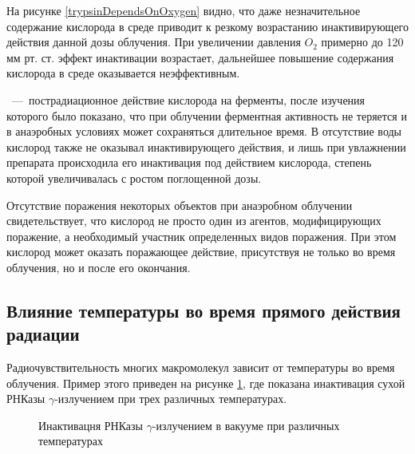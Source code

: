 \documentclass[a4paper, 14pt]{article}
\renewcommand{\emph}[1]{{\color{orange}{\textit{\textbf{#1}}}}}
\begin{document}
На рисунке \ref{trypsinDependsOnOxygen} видно, что даже незначительное содержание кислорода в среде приводит к резкому возрастанию инактивирующего действия данной дозы облучения. При увеличении давления $O_2$ примерно до 120 мм рт. ст. эффект инактивации возрастает, дальнейшее повышение содержания кислорода в среде оказывается неэффективным.

\emph{Кислородное последействие}~---~пострадиационное действие кислорода на
ферменты, после изучения которого было показано, что при облучении ферментная
активность не теряется и в анаэробных условиях может сохраняться длительное время.
В отсутствие воды кислород также не оказывал инактивирующего действия, и лишь при увлажнении препарата происходила его инактивация под действием кислорода,
степень которой увеличивалась с ростом поглощенной дозы.

Отсутствие поражения некоторых объектов при анаэробном облучении
свидетельствует, что кислород не просто один из агентов, модифицирующих
поражение, а необходимый участник определенных видов поражения. При этом
кислород может оказать поражающее действие, присутствуя не только во время
облучения, но и после его окончания.

\subsection{Влияние температуры во время прямого действия радиации}
Радиочувствительность многих макромолекул зависит от температуры во время облучения. Пример этого приведен на рисунке \ref{inactivationOfRNAWithVariousTemp}, где показана инактивация сухой РНКазы $\gamma$-излучением при трех различных температурах.  

\begin{figure}
    \centering
    \caption{Инактивацня РНКазы $\gamma$-излучением  в вакууме при различных температурах}
    \label{inactivationOfRNAWithVariousTemp}
\end{figure}
\end{document}
